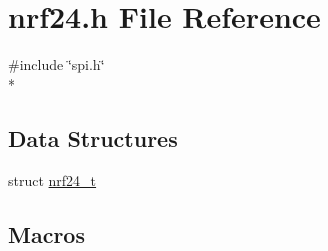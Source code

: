 \hypertarget{a00013}{\section{nrf24.\-h File Reference}
\label{a00013}
}
{\ttfamily \#include \char`\"{}spi.\-h\char`\"{}}\\*
\subsection*{Data Structures}
\begin{DoxyCompactItemize}
\item 
struct \hyperlink{a00007}{nrf24\-\_\-t}
\end{DoxyCompactItemize}
\subsection*{Macros}
